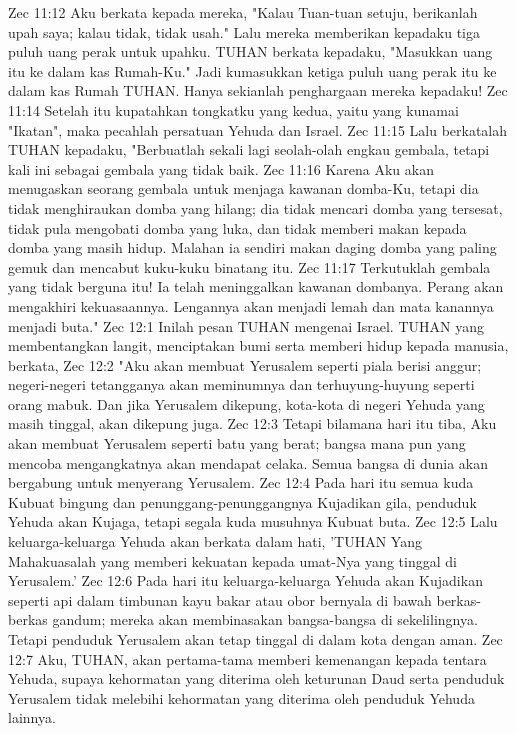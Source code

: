Zec 11:12  Aku berkata kepada mereka, "Kalau Tuan-tuan setuju, berikanlah upah saya; kalau tidak, tidak usah." Lalu mereka memberikan kepadaku tiga puluh uang perak untuk upahku. TUHAN berkata kepadaku, "Masukkan uang itu ke dalam kas Rumah-Ku." Jadi kumasukkan ketiga puluh uang perak itu ke dalam kas Rumah TUHAN. Hanya sekianlah penghargaan mereka kepadaku!
Zec 11:14  Setelah itu kupatahkan tongkatku yang kedua, yaitu yang kunamai "Ikatan", maka pecahlah persatuan Yehuda dan Israel.
Zec 11:15  Lalu berkatalah TUHAN kepadaku, "Berbuatlah sekali lagi seolah-olah engkau gembala, tetapi kali ini sebagai gembala yang tidak baik.
Zec 11:16  Karena Aku akan menugaskan seorang gembala untuk menjaga kawanan domba-Ku, tetapi dia tidak menghiraukan domba yang hilang; dia tidak mencari domba yang tersesat, tidak pula mengobati domba yang luka, dan tidak memberi makan kepada domba yang masih hidup. Malahan ia sendiri makan daging domba yang paling gemuk dan mencabut kuku-kuku binatang itu.
Zec 11:17  Terkutuklah gembala yang tidak berguna itu! Ia telah meninggalkan kawanan dombanya. Perang akan mengakhiri kekuasaannya. Lengannya akan menjadi lemah dan mata kanannya menjadi buta."
Zec 12:1  Inilah pesan TUHAN mengenai Israel. TUHAN yang membentangkan langit, menciptakan bumi serta memberi hidup kepada manusia, berkata,
Zec 12:2  "Aku akan membuat Yerusalem seperti piala berisi anggur; negeri-negeri tetangganya akan meminumnya dan terhuyung-huyung seperti orang mabuk. Dan jika Yerusalem dikepung, kota-kota di negeri Yehuda yang masih tinggal, akan dikepung juga.
Zec 12:3  Tetapi bilamana hari itu tiba, Aku akan membuat Yerusalem seperti batu yang berat; bangsa mana pun yang mencoba mengangkatnya akan mendapat celaka. Semua bangsa di dunia akan bergabung untuk menyerang Yerusalem.
Zec 12:4  Pada hari itu semua kuda Kubuat bingung dan penunggang-penunggangnya Kujadikan gila, penduduk Yehuda akan Kujaga, tetapi segala kuda musuhnya Kubuat buta.
Zec 12:5  Lalu keluarga-keluarga Yehuda akan berkata dalam hati, 'TUHAN Yang Mahakuasalah yang memberi kekuatan kepada umat-Nya yang tinggal di Yerusalem.'
Zec 12:6  Pada hari itu keluarga-keluarga Yehuda akan Kujadikan seperti api dalam timbunan kayu bakar atau obor bernyala di bawah berkas-berkas gandum; mereka akan membinasakan bangsa-bangsa di sekelilingnya. Tetapi penduduk Yerusalem akan tetap tinggal di dalam kota dengan aman.
Zec 12:7  Aku, TUHAN, akan pertama-tama memberi kemenangan kepada tentara Yehuda, supaya kehormatan yang diterima oleh keturunan Daud serta penduduk Yerusalem tidak melebihi kehormatan yang diterima oleh penduduk Yehuda lainnya.
